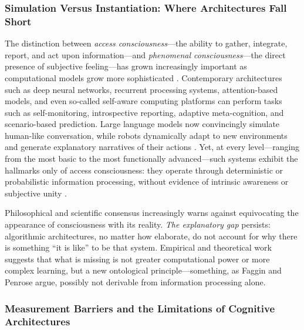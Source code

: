 \subsubsection{Simulation Versus Instantiation: Where Architectures Fall Short}

The distinction between \emph{access consciousness}---the ability to gather, integrate, report, and act upon information---and \emph{phenomenal consciousness}---the direct presence of subjective feeling---has grown increasingly important as computational models grow more sophisticated \cite{block1995confusion,reggia2013rise}. Contemporary architectures such as deep neural networks, recurrent processing systems, attention-based models, and even so-called self-aware computing platforms \cite{kounev2017notion,lewis2016self} can perform tasks such as self-monitoring, introspective reporting, adaptive meta-cognition, and scenario-based prediction. Large language models now convincingly simulate human-like conversation, while robots dynamically adapt to new environments and generate explanatory narratives of their actions \cite{gamez2008progress,qin2025taxonomy}. Yet, at every level---ranging from the most basic to the most functionally advanced---such systems exhibit the hallmarks only of access consciousness: they operate through deterministic or probabilistic information processing, without evidence of intrinsic awareness or subjective unity \cite{garridomerchan2024machine}.

Philosophical and scientific consensus increasingly warns against equivocating the appearance of consciousness with its reality. \emph{The explanatory gap} \cite{levine1983materialism} persists: algorithmic architectures, no matter how elaborate, do not account for why there is something ``it is like'' to be that system. Empirical and theoretical work suggests that what is missing is not greater computational power or more complex learning, but a new ontological principle---something, as Faggin \cite{faggin2024irreducible} and Penrose \cite{penrose1990emperors} argue, possibly not derivable from information processing alone.

\subsubsection{Measurement Barriers and the Limitations of Cognitive Architectures}

